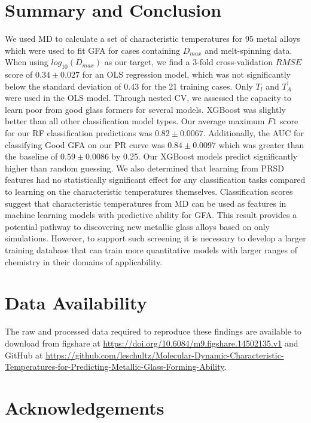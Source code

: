 \documentclass[11pt,a4paper]{article}                                %
\begin{document}
\section{Summary and Conclusion}

\par
We used MD to calculate a set of characteristic temperatures for 95 metal alloys which were used to fit GFA for cases containing $D_{max}$ and melt-spinning data. When using $log_{10}(D_{max})$ as our target, we find a 3-fold cross-validation $RMSE$ score of $0.34 \pm 0.027$ for an OLS regression model, which was not significantly below the standard deviation of 0.43 for the 21 training cases. Only $T_{l}$ and $T_{A}^{'}$ were used in the OLS model. Through nested CV, we assessed the capacity to learn poor from good glass formers for several models. XGBoost was slightly better than all other classification model types. Our average maximum $F1$ score for our RF classification predictions was $0.82 \pm 0.0067$. Additionally, the AUC for classifying Good GFA on our PR curve was $0.84 \pm 0.0097$ which was greater than the baseline of $0.59 \pm 0.0086$ by 0.25. Our XGBoost models predict significantly higher than random guessing. We also determined that learning from PRSD features had no statistically significant effect for any classification tasks compared to learning on the characteristic temperatures themselves. Classification scores suggest that characteristic temperatures from MD can be used as features in machine learning models with predictive ability for GFA. This result provides a potential pathway to discovering new metallic glass alloys based on only simulations. However, to support such screening it is necessary to develop a larger training database that can train more quantitative models with larger ranges of chemistry in their domains of applicability.

\section*{Data Availability}

\par
The raw and processed data required to reproduce these findings are available to download from figshare at \url{https://doi.org/10.6084/m9.figshare.14502135.v1} and GitHub at \url{https://github.com/leschultz/Molecular-Dynamic-Characteristic-Temperatures-for-Predicting-Metallic-Glass-Forming-Ability}.

\section*{Acknowledgements}
\end{document}
